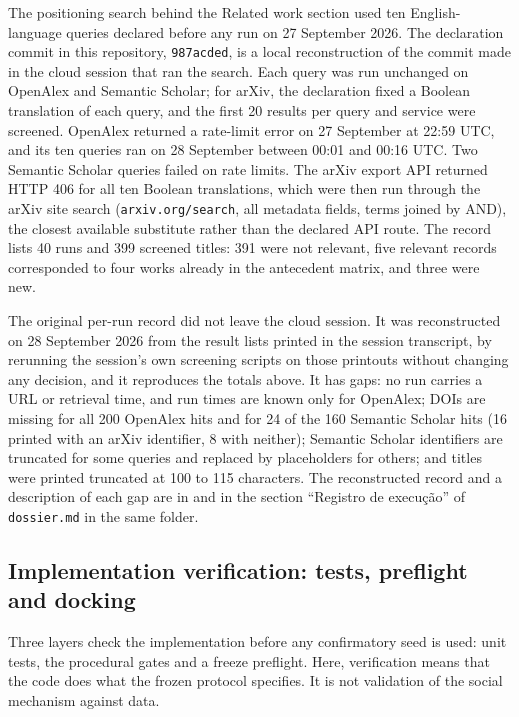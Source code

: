 The positioning search behind the Related work section used ten English-language queries declared before any run on 27 September 2026. The declaration commit in this repository, \texttt{987acded}, is a local reconstruction of the commit made in the cloud session that ran the search. Each query was run unchanged on OpenAlex and Semantic Scholar; for arXiv, the declaration fixed a Boolean translation of each query, and the first 20 results per query and service were screened. OpenAlex returned a rate-limit error on 27 September at 22:59 UTC, and its ten queries ran on 28 September between 00:01 and 00:16 UTC. Two Semantic Scholar queries failed on rate limits. The arXiv export API returned HTTP 406 for all ten Boolean translations, which were then run through the arXiv site search (\texttt{arxiv.org/search}, all metadata fields, terms joined by AND), the closest available substitute rather than the declared API route. The record lists 40 runs and 399 screened titles: 391 were not relevant, five relevant records corresponded to four works already in the antecedent matrix, and three were new.

The original per-run record did not leave the cloud session. It was reconstructed on 28 September 2026 from the result lists printed in the session transcript, by rerunning the session's own screening scripts on those printouts without changing any decision, and it reproduces the totals above. It has gaps: no run carries a URL or retrieval time, and run times are known only for OpenAlex; DOIs are missing for all 200 OpenAlex hits and for 24 of the 160 Semantic Scholar hits (16 printed with an arXiv identifier, 8 with neither); Semantic Scholar identifiers are truncated for some queries and replaced by placeholders for others; and titles were printed truncated at 100 to 115 characters. The reconstructed record and a description of each gap are in  and in the section ``Registro de execu\c{c}\~ao'' of \texttt{dossier.md} in the same folder.

\subsection*{Implementation verification: tests, preflight and docking}\label{supp:verification-details}

Three layers check the implementation before any confirmatory seed is used: unit tests, the procedural gates and a freeze preflight. Here, verification means that the code does what the frozen protocol specifies. It is not validation of the social mechanism against data.

